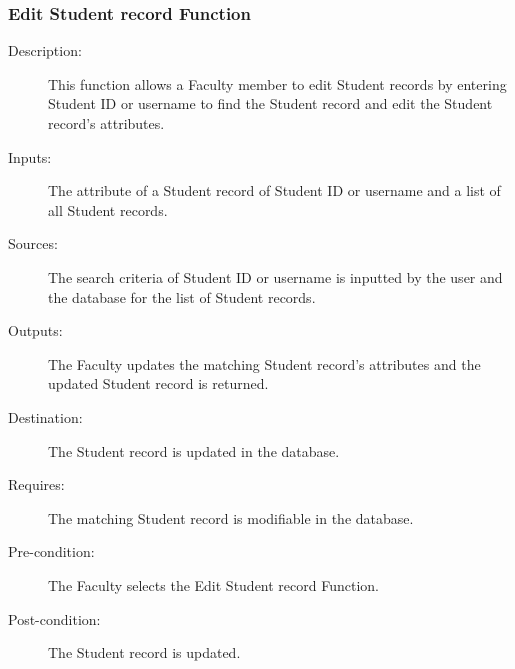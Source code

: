 \subsubsection{\large Edit Student record Function} 
\begin{boxed} %
\begin{description}
\item[Description:]
   This function allows a Faculty member to edit Student records by entering
   Student ID or username to find the Student record and edit the Student
   record's attributes.
\item[Inputs:]
   The attribute of a Student record of Student ID or username and a list of all
   Student records.
\item[Sources:]
   The search criteria of Student ID or username is inputted by the user and the
   database for the list of Student records.
\item[Outputs:]
   The Faculty updates the matching Student record's attributes and the updated
   Student record is returned.
\item[Destination:]
   The Student record is updated in the database.
\item[Requires:]
   The matching Student record is modifiable in the database.
\item[Pre-condition:]
   The Faculty selects the Edit Student record Function.
\item[Post-condition:]
   The Student record is updated.
\end{description}
\end{boxed} %

